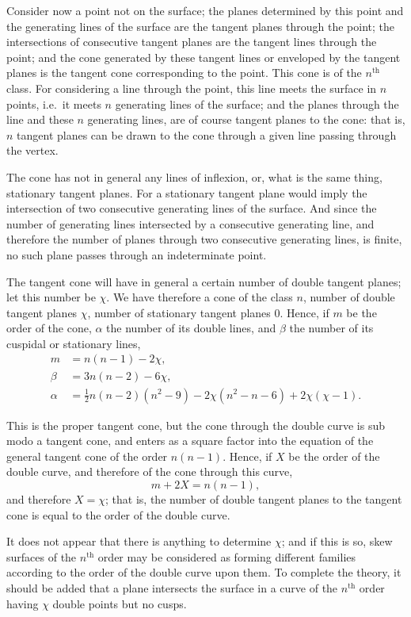 \documentclass[11pt,a4paper]{article}
\theoremstyle{plain}
\begin{document}
Consider now a point not on the surface; the planes determined by this point and the generating lines of the surface are the tangent planes through the point; the intersections of consecutive tangent planes are the tangent lines through the point; and the cone generated by these tangent lines or enveloped by the tangent planes is the tangent cone corresponding to the point. This cone is of the $n^{\text{th}}$ class. For considering a line through the point, this line meets the surface in $n$ points, i.e.\ it meets $n$ generating lines of the surface; and the planes through the line and these $n$ generating lines, are of course tangent planes to the cone: that is, $n$ tangent planes can be drawn to the cone through a given line passing through the vertex.

The cone has not in general any lines of inflexion, or, what is the same thing, stationary tangent planes. For a stationary tangent plane would imply the intersection of two consecutive generating lines of the surface. And since the number of generating lines intersected by a consecutive generating line, and therefore the number of planes through two consecutive generating lines, is finite, no such plane passes through an indeterminate point.

The tangent cone will have in general a certain number of double tangent planes; let this number be $\chi$. We have therefore a cone of the class $n$, number of double tangent planes $\chi$, number of stationary tangent planes $0$. Hence, if $m$ be the order of the cone, $\alpha$ the number of its double lines, and $\beta$ the number of its cuspidal or stationary lines,
\begin{align*}
m &= n(n-1) - 2\chi, \\
\beta &= 3n(n-2) - 6\chi, \\
\alpha &= \tfrac{1}{2}n(n-2)(n^2-9) - 2\chi(n^2-n-6) + 2\chi(\chi-1).
\end{align*}

This is the proper tangent cone, but the cone through the double curve is sub modo a tangent cone, and enters as a square factor into the equation of the general tangent cone of the order $n(n-1)$. Hence, if $X$ be the order of the double curve, and therefore of the cone through this curve,
\[m + 2X = n(n-1),\]
and therefore $X = \chi$; that is, the number of double tangent planes to the tangent cone is equal to the order of the double curve.

It does not appear that there is anything to determine $\chi$; and if this is so, skew surfaces of the $n^{\text{th}}$ order may be considered as forming different families according to the order of the double curve upon them. To complete the theory, it should be added that a plane intersects the surface in a curve of the $n^{\text{th}}$ order having $\chi$ double points but no cusps.
\clearpage
\end{document}
